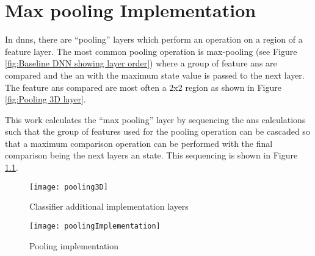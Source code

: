 

\chapter{Max pooling Implementation}
\label{sec:Appendix-B}
\label{sec:Max pooling}

In \acp{dnn}, there are ``pooling''\cite{stanford_pooling} layers which perform an operation on a region of a feature layer. 
The most common pooling operation is max-pooling (see Figure \ref{fig:Baseline DNN showing layer order}) where a group of feature \acp{an} are compared and the \ac{an} with the maximum state value is passed to the next layer.
The feature \acp{an} compared are most often a 2x2 region as shown in Figure \ref{fig:Pooling 3D layer}.

This work calculates the ``max pooling'' layer by sequencing the \acp{an} calculations such that the group of features used for the pooling operation can be cascaded so that a maximum comparison operation can be performed with the final comparison being the next layers \ac{an} state.
This sequencing is shown in Figure \ref{fig:Pooling implementation}.

\begin{figure}[h]
  \centering
  \captionsetup{justification=centering}
  \captionsetup{width=0.9\textwidth}
  \begin{minipage}{1\textwidth}
    \centering
    \centerline{
    \mbox{\texttt{[image: pooling3D]}}
    }
    \caption{Classifier additional implementation layers}
    \label{fig:Pooling 3D layer}
  \end{minipage}

  \bigskip
  \vspace{0.5cm}
  \begin{minipage}{1\textwidth}
    \centering
    \centerline{
    \mbox{\texttt{[image: poolingImplementation]}}
    }
    \caption{Pooling implementation}
    \label{fig:Pooling implementation}
  \end{minipage}
\end{figure}


